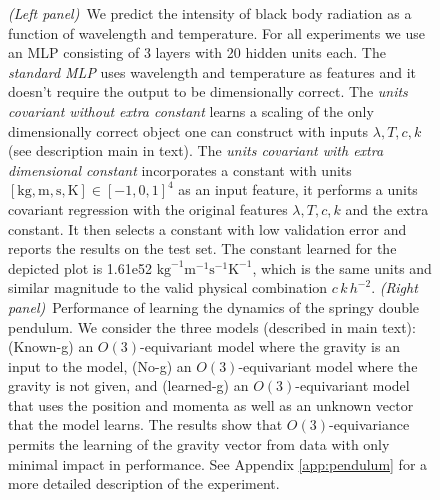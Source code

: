 \documentclass{article}
\theoremstyle{plain}
\theoremstyle{definition}
\theoremstyle{remark}
\newcommand{\unit}[1]{\mathrm{#1}}
\newcommand{\kg}{\unit{kg}}
\newcommand{\m}{\unit{m}}
\newcommand{\s}{\unit{s}}
\newcommand{\K}{\unit{K}}
\begin{document}
\begin{figure}[t!]
\begin{minipage}{0.5\textwidth}
    \end{minipage}\vspace{-1.5ex}
    \caption{\textsl{(Left panel)}~We predict the intensity of black body radiation as a function of wavelength and temperature. For all experiments we use an MLP consisting of 3 layers with 20 hidden units each. The \emph{standard MLP} uses wavelength and temperature as features and it doesn't require the output to be dimensionally correct. The \emph{units covariant without extra constant} learns a scaling of the only dimensionally correct object one can construct with inputs $\lambda, T, c, k$ (see description main in text). The \emph{units covariant with extra dimensional constant} incorporates a constant with units $[\kg, \m, \s, \K]\in[-1,0,1]^4$ as an input feature, it performs a units covariant regression with the original features $\lambda, T, c, k$ and the extra constant. It then selects a constant with low validation error and reports the results on the test set. The constant learned for the depicted plot is 1.61e52 $\kg^{-1}\m^{-1}\s^{-1}\K^{-1}$, which is the same units and similar magnitude to the valid physical combination $c\,k\,h^{-2}$.
    \textsl{(Right panel)}~Performance of learning the dynamics of the springy double pendulum. We consider the three models (described in main text): (Known-g) an $O(3)$-equivariant model where the gravity is an input to the model, (No-g) an $O(3)$-equivariant model where the gravity is not given, and (learned-g) an $O(3)$-equivariant model that uses the position and momenta as well as an unknown vector that the model learns. The results show that $O(3)$-equivariance permits the learning of the gravity vector from data with only minimal impact in performance. See Appendix \ref{app:pendulum} for a more detailed description of the experiment.}
    \label{fig:my_label}
    \vspace{-1.5ex}
\end{figure}
\end{document}
